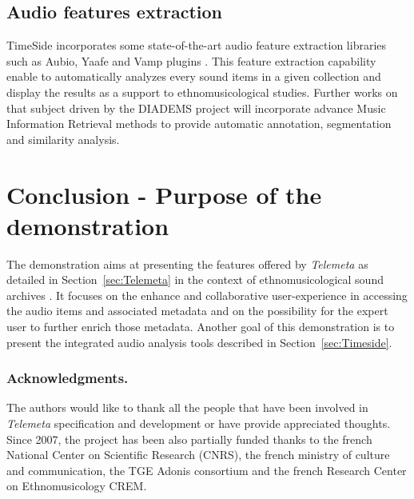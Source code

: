 \documentclass[runningheads,a4paper]{llncs}
\begin{document}
\subsection{Audio features extraction}
TimeSide incorporates some state-of-the-art audio feature extraction libraries such as Aubio, Yaafe and Vamp plugins \cite{brossierPhD,yaafe_ISMIR2010,vamp-plugins}.
This feature extraction capability enable to automatically analyzes every sound items in a given collection and display the results as a support to ethnomusicological studies.
Further works on that subject driven by the DIADEMS project will incorporate advance Music Information Retrieval methods to provide automatic annotation, segmentation and similarity analysis.

\section{Conclusion - Purpose of the demonstration}\vspace{-0.2cm}
The demonstration aims at presenting the features offered by \emph{Telemeta} as detailed in Section~\ref{sec:Telemeta} in the context of ethnomusicological sound archives \cite{telemetaCREM}. It focuses on the enhance and collaborative user-experience in accessing the audio items and associated metadata and on the possibility for the expert user to further enrich those metadata.
Another goal of this demonstration is to present the integrated audio analysis tools described in Section~\ref{sec:Timeside}.

\vspace{-0.2cm}
\subsubsection*{Acknowledgments.} 
The authors would like to thank all the people that have been involved in \emph{Telemeta} specification and development or have provide appreciated thoughts. Since 2007, the project has been also partially funded thanks to the french National Center on Scientific Research (CNRS), the french ministry of culture and communication, the TGE Adonis consortium and the french Research Center on Ethnomusicology CREM.




\end{document}
